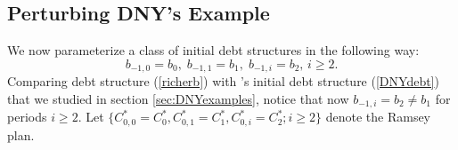 \documentclass[12pt]{article}
\begin{document}
\subsection{Perturbing DNY's Example} \label{subsec6.1}
We now parameterize  a class of initial debt structures in the following way:
\begin{equation} \label{richerb} 
b_{-1, 0}=b_0,\; b_{-1, 1}=b_1, \; b_{-1, i}=b_2,\,  i\geq 2  .
\end{equation} 
Comparing debt structure  (\ref{richerb})  with  \citeauthor{debortoli2021optimal}'s initial debt structure (\ref{DNYdebt}) that we  studied in  section \ref{sec:DNYexamples}, notice  that now $b_{-1, i}=b_2\neq b_1$ for periods $i\geq 2$. {Let $\{C_{0, 0}^*=C_0^*, C_{0, 1}^*=C_1^*, C_{0, i}^*=C_2^*; i\geq 2\}$ denote the Ramsey plan.}  %
\end{document}
